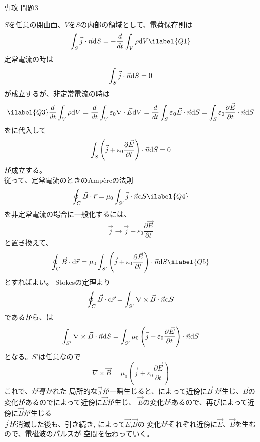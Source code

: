 \documentclass[fleqn]{jbook}
\begin{document}
\begin{answer}{専攻 問題3}{}
\begin{subanswers}
 \SubAnswer
  \begin{subsubanswers}
  \SubSubAnswer
    $S$を任意の閉曲面、$V$を$S$の内部の領域として、電荷保存則は
    \begin{eqnarray}
      \int_{S} \vec{j} \cdot \vec{n} {\d{S}} = -\frac{d}{dt}
      \int_{V} \rho {\d{V}}
      \ilabel{Q1}
    \end{eqnarray}
    定常電流の時は
    \[
      \int_{S} \vec{j} \cdot \vec{n} {{\rm d}S} = 0
    \]
    が成立するが、非定常電流の時は
    \begin{eqnarray}
    \ilabel{Q3}
      \frac{d}{dt} \int_{V} \rho {\d{V}} = 
      \frac{d}{dt} \int_{V} \varepsilon_0 \nabla \cdot \vec{E} {\d{V}} = 
      \frac{d}{dt} \int_{S} \varepsilon_0 \vec{E} \cdot \vec{n} {\d{S}} = 
      \int_{S} \varepsilon_0 \frac{\partial \vec{E}}{\partial t} \cdot %
      \vec{n} {\d{S}}
    \end{eqnarray}
    をに代入して
    \[
      \int_{S} \left( \vec{j} + \varepsilon_0 \frac{\partial \vec{E}} %
      {\partial t} \right) \cdot \vec{n} {\d{S}} = 0
    \]
    が成立する。\\
    従って、定常電流のときのAmp\`{e}reの法則
    \begin{eqnarray}
      \oint_{C} \vec{B} \cdot \vec{r} = %
      \mu_{0} \int_{S'} \vec{j} \cdot \vec{n} {\d{S}}
      \ilabel{Q4}
    \end{eqnarray}
    を非定常電流の場合に一般化するには、
    \[
      \vec{j} \rightarrow %
      \vec{j} + \varepsilon_0 \frac{\partial \vec{E}}{\partial t}
    \]
    と置き換えて、
    \begin{eqnarray}
      \oint_{C} \vec{B} \cdot {\d{\vec{r}}} = %
      \mu_{0} \int_{S'} \left( \vec{j} + \varepsilon_0 \frac %
      {\partial \vec{E}}{\partial t} \right) \cdot \vec{n} {\d{S}}
      \ilabel{Q5}
    \end{eqnarray}
    とすればよい。
    Stokesの定理より
    \[
      \oint_{C} \vec{B} \cdot {\d{\vec{r}}} = %
      \int_{S'} \nabla \times \vec{B} \cdot \vec{n} {\d{S}}
    \]
    であるから、は
    \[
      \int_{S'} \nabla \times \vec{B} \cdot \vec{n} {\d{S}} = %
      \int_{S'} \mu_{0} \left( \vec{j} + \varepsilon_0 \frac %
      {\partial \vec{E}}{\partial t} \right) \cdot \vec{n} {\d{S}}
    \]
    となる。$S'$は任意なので
    \[
      \nabla \times \vec{B} = \mu_{0} \left( \vec{j} + %
      \varepsilon_0 \frac {\partial \vec{E}}{\partial t} \right)
    \]
    これで、が導かれた
  \SubSubAnswer
    局所的な$\vec{j}$が一瞬生じると、によって近傍に$\vec{B}$
    が生じ、$\vec{B}$の変化があるのでによって近傍に$\vec{E}$が生じ、
    $\vec{E}$の変化があるので、再びによって近傍に$\vec{B}$が生じる\\
    $\vec{j}$が消滅した後も、引き続き,
    によって$\vec{E}$,$\vec{B}$の
    変化がそれぞれ近傍に$\vec{E}$、$\vec{B}$を生むので、電磁波のパルスが
    空間を伝わっていく。


\end{subsubanswers}
\end{subanswers}
\end{answer}
\end{document}
